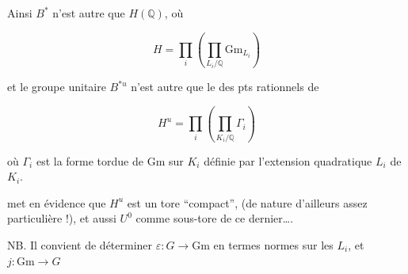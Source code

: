 Ainsi $B^*$ n'est autre que $H(\mathbb Q)$, où

\[
H=\prod_i\left(\prod_{L_i/\mathbb Q}\mathrm{Gm}_{L_i}\right)
\]

et le groupe unitaire $B^{*u}$ n'est autre que le  des pts rationnels de

\[
H^u=\prod_i\left(\prod_{K_i/\mathbb Q}\Gamma_i\right)
\]

où $\Gamma_i$ est la forme tordue de $\mathrm{Gm}$ sur $K_i$ définie par l'extension quadratique $L_i$ de $K_i$.

\deleted{[}   met en évidence que $H^u$ est un tore ``compact'',  (de nature d'ailleurs assez particulière !), et aussi $U^0$ comme sous-tore de ce dernier\ldots.

NB. Il convient de déterminer $\varepsilon:G\longrightarrow\mathrm{Gm}$ en termes    normes sur les $L_i$, et $j:\mathrm{Gm}\longrightarrow G$ \margin{$=\ldots$}

